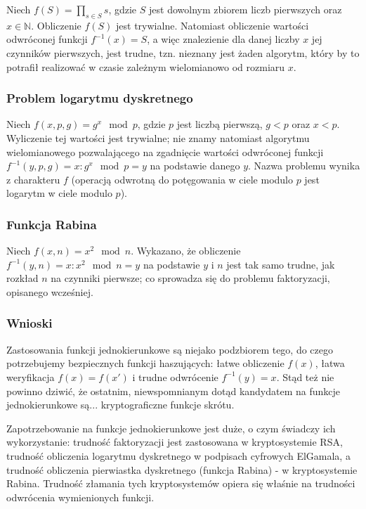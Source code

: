 \documentclass[12pt,a4paper,twoside]{article}
\begin{document}
Niech $f(S) = \prod_{s \in S} s$, gdzie $S$ jest dowolnym zbiorem liczb
pierwszych oraz $x \in \mathbb{N}$. Obliczenie $f(S)$ jest trywialne. Natomiast
obliczenie wartości odwróconej funkcji $f^{-1}(x)=S$, a więc znalezienie dla
danej liczby $x$ jej czynników pierwszych, jest trudne, tzn. nieznany jest
żaden algorytm, który by to potrafił realizować w czasie zależnym wielomianowo
od rozmiaru $x$.

\subsubsection{Problem logarytmu dyskretnego}
Niech $f(x, p, g) = g^x \mod p$, gdzie $p$ jest liczbą pierwszą, $g < p$ oraz
$x < p$. Wyliczenie tej wartości jest trywialne; nie znamy natomiast algorytmu
wielomianowego pozwalającego na zgadnięcie wartości odwróconej funkcji
\mbox{$f^{-1}(y, p, g) = x : g^x \mod p = y$} na podstawie danego $y$. Nazwa problemu
wynika z charakteru $f$ (operacją odwrotną do potęgowania w ciele modulo $p$
jest logarytm w ciele modulo $p$).

\subsubsection{Funkcja Rabina}
Niech $f(x,n) = x^2 \mod n$. Wykazano, że obliczenie $f^{-1}(y,n) = x : x^2
\mod n = y$ na podstawie $y$ i $n$ jest tak samo trudne, jak rozkład $n$ na
czynniki pierwsze; co sprowadza się do problemu faktoryzacji, opisanego
wcześniej.

\subsubsection{Wnioski}
Zastosowania funkcji jednokierunkowe są niejako podzbiorem tego, do czego
potrzebujemy bezpiecznych funkcji haszujących: łatwe obliczenie $f(x)$, łatwa
weryfikacja $f(x)=f(x')$ i trudne odwrócenie $f^{-1}(y)=x$. Stąd też nie
powinno dziwić, że ostatnim, niewspomnianym dotąd kandydatem na funkcje
jednokierunkowe są... kryptograficzne funkcje skrótu.

Zapotrzebowanie na funkcje jednokierunkowe jest duże, o czym świadczy ich
wykorzystanie: trudność faktoryzacji jest zastosowana w kryptosystemie RSA,
trudność obliczenia logarytmu dyskretnego w podpisach cyfrowych ElGamala, a
trudność obliczenia pierwiastka dyskretnego (funkcja Rabina) - w kryptosystemie
Rabina. Trudność złamania tych kryptosystemów opiera się właśnie na trudności
odwrócenia wymienionych funkcji.
\end{document}
